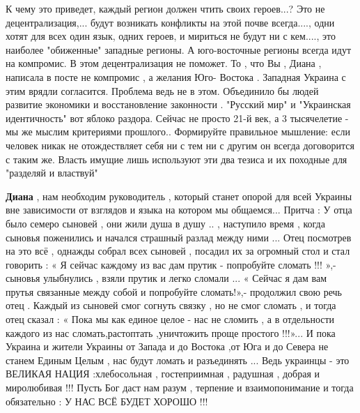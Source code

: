 \begin{itemize}
К чему это приведет, каждый регион должен чтить своих героев...? Это не
децентрализация,... будут возникать конфликты на этой почве всегда...., одни
хотят для всех один язык, одних героев, и мириться не будут ни с кем...., это
наиболее "обиженные" западные регионы. А юго-восточные регионы всегда идут на
компромис. В этом децентрализация не поможет.
То , что Вы , Диана , написала в посте не компромис , а желания Юго- Востока .
Западная Украина с этим врядли согласится. Проблема ведь не в этом. Объединило
бы людей развитие экономики и восстановление законности .
"Русский мир" и "Украинская идентичность" вот яблоко раздора. Сейчас не просто
21-й век, а 3 тысячелетие - мы же мыслим критериями прошлого.. Формируйте
правильное мышление: если человек никак не отождествляет себя ни с тем ни с
другим он всегда договорится с таким же. Власть имущие лишь используют эти два
тезиса и их походные для "разделяй и властвуй"

\textbf{Диана} , 
нам необходим руководитель , который станет опорой для всей Украины вне
зависимости от взглядов и языка на котором мы общаемся...
Притча :
У отца было семеро сыновей , они жили душа в душу .. , наступило время , когда
сыновья поженились и начался страшный разлад между ними ...
Отец посмотрев на это всё , однажды собрал всех сыновей , посадил их за
огромный стол и стал говорить : « Я сейчас каждому из вас дам прутик -
попробуйте сломать !!! »,- сыновья улыбнулись , взяли прутик и легко сломали
...
« Сейчас я дам вам прутья связанные между собой и попробуйте сломать!»,-
продолжил свою речь отец .
Каждый из сыновей смог согнуть связку , но не смог сломать , и тогда отец
сказал : « Пока мы как единое целое - нас не сломить , а в отдельности каждого
из нас сломать,растоптать ,уничтожить проще простого !!!»...
И пока Украина и жители Украины от Запада и до Востока ,от Юга и до Севера не
станем Единым Целым , нас будут ломать и разъединять ...
Ведь украинцы - это ВЕЛИКАЯ НАЦИЯ :хлебосольная , гостеприимная , радушная ,
добрая и миролюбивая !!!
Пусть Бог даст нам разум , терпение и взаимопонимание и тогда обязательно : У
НАС ВСЁ БУДЕТ ХОРОШО !!!


\end{itemize}
